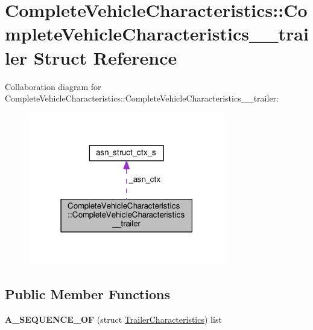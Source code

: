 \hypertarget{structCompleteVehicleCharacteristics_1_1CompleteVehicleCharacteristics____trailer}{}\section{Complete\+Vehicle\+Characteristics\+:\+:Complete\+Vehicle\+Characteristics\+\_\+\+\_\+trailer Struct Reference}
\label{structCompleteVehicleCharacteristics_1_1CompleteVehicleCharacteristics____trailer}


Collaboration diagram for Complete\+Vehicle\+Characteristics\+:\+:Complete\+Vehicle\+Characteristics\+\_\+\+\_\+trailer\+:\nopagebreak
\begin{figure}[H]
\begin{center}
\leavevmode
\includegraphics[width=243pt]{structCompleteVehicleCharacteristics_1_1CompleteVehicleCharacteristics____trailer__coll__graph}
\end{center}
\end{figure}
\subsection*{Public Member Functions}
\begin{DoxyCompactItemize}
\item 
{\bfseries A\+\_\+\+S\+E\+Q\+U\+E\+N\+C\+E\+\_\+\+OF} (struct \hyperlink{structTrailerCharacteristics}{Trailer\+Characteristics}) list\hypertarget{structCompleteVehicleCharacteristics_1_1CompleteVehicleCharacteristics____trailer_ae481841670599e0ce96287172adcbc0e}{}\label{structCompleteVehicleCharacteristics_1_1CompleteVehicleCharacteristics____trailer_ae481841670599e0ce96287172adcbc0e}

\end{DoxyCompactItemize}
